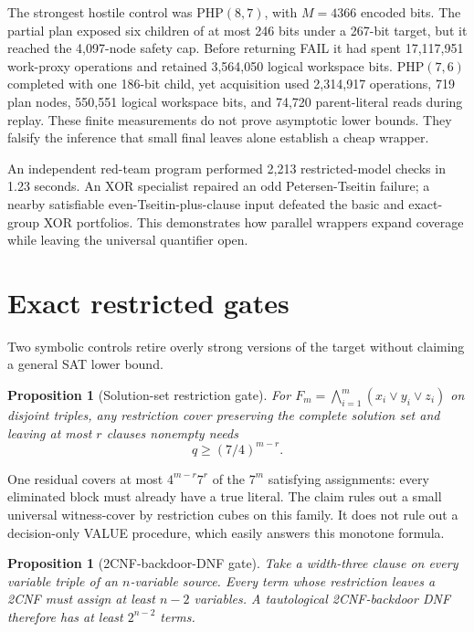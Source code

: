 \documentclass[11pt]{article}
\newtheorem{proposition}[theorem]{Proposition}
\begin{document}
The strongest hostile control was PHP$(8,7)$, with $M=4366$ encoded bits.
The partial plan exposed six children of at most 246 bits under a 267-bit
target, but it reached the 4,097-node safety cap.  Before returning FAIL it
had spent 17,117,951 work-proxy operations and retained 3,564,050 logical
workspace bits.  PHP$(7,6)$ completed with one 186-bit child, yet acquisition
used 2,314,917 operations, 719 plan nodes, 550,551 logical workspace bits,
and 74,720 parent-literal reads during replay.  These finite measurements do
not prove asymptotic lower bounds.  They falsify the inference that small
final leaves alone establish a cheap wrapper.

An independent red-team program performed 2,213 restricted-model checks in
1.23 seconds.  An XOR specialist repaired an odd Petersen-Tseitin failure;
a nearby satisfiable even-Tseitin-plus-clause input defeated the basic and
exact-group XOR portfolios.  This demonstrates how parallel wrappers expand
coverage while leaving the universal quantifier open.

\section{Exact restricted gates}

Two symbolic controls retire overly strong versions of the target without
claiming a general SAT lower bound.

\begin{proposition}[Solution-set restriction gate]
For
$F_m=\bigwedge_{i=1}^{m}(x_i\vee y_i\vee z_i)$ on disjoint triples, any
restriction cover preserving the complete solution set and leaving at most
$r$ clauses nonempty needs
\[
 q\ge(7/4)^{m-r}.
\]
\end{proposition}

One residual covers at most $4^{m-r}7^r$ of the $7^m$ satisfying assignments:
every eliminated block must already have a true literal.  The claim rules out
a small universal witness-cover by restriction cubes on this family.  It does
not rule out a decision-only VALUE procedure, which easily answers this
monotone formula.

\begin{proposition}[2CNF-backdoor-DNF gate]
Take a width-three clause on every variable triple of an $n$-variable source.
Every term whose restriction leaves a 2CNF must assign at least $n-2$
variables.  A tautological 2CNF-backdoor DNF therefore has at least
$2^{n-2}$ terms.
\end{proposition}
\end{document}

